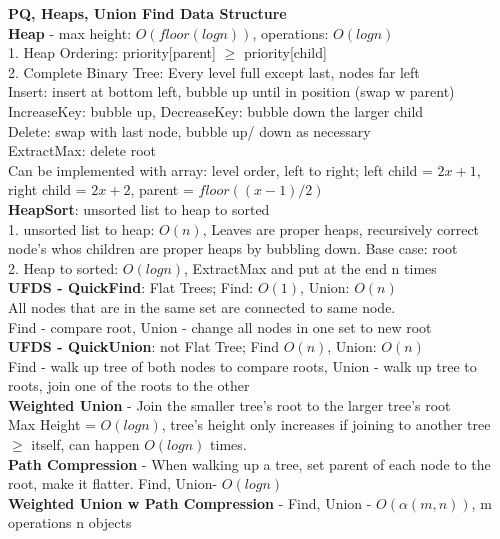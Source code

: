 \documentclass[10pt, a4paper]{article}
\begin{document}
\begin{multicols*}{3}
		{\normalsize\textbf{PQ, Heaps, Union Find Data Structure}}\\
		\textbf{Heap} - max height: $O(floor(logn))$, operations: $O(logn)$\\
		1. Heap Ordering: priority[parent] $\geq$ priority[child]\\
		2. Complete Binary Tree: Every level full except last, nodes far left \\
		Insert: insert at bottom left, bubble up until in position (swap w parent)\\
		IncreaseKey: bubble up, DecreaseKey: bubble down the larger child\\
		Delete: swap with last node, bubble up/ down as necessary\\
		ExtractMax: delete root\\
		Can be implemented with array: level order, left to right; left child = $2x + 1$, right child = $2x + 2$, parent = $floor((x-1)/2)$\\
		\textbf{HeapSort}: unsorted list to heap to sorted\\
		1. unsorted list to heap: $O(n)$, Leaves are proper heaps, recursively correct node's whos children are proper heaps by bubbling down. Base case: root\\
		2. Heap to sorted: $O(logn)$, ExtractMax and put at the end n times\\
		\textbf{UFDS - QuickFind}: Flat Trees; Find: $O(1)$, Union: $O(n)$\\
		All nodes that are in the same set are connected to same node.\\
		Find - compare root, Union - change all nodes in one set to new root\\
		\textbf{UFDS - QuickUnion}: not Flat Tree; Find $O(n)$, Union: $O(n)$\\
		Find - walk up tree of both nodes to compare roots, Union - walk up tree to roots, join one of the roots to the other\\
		\textbf{Weighted Union} - Join the smaller tree's root to the larger tree's root\\
		Max Height = $O(logn)$, tree's height only increases if joining to another tree $\geq$ itself, can happen $O(logn)$ times.\\
		\textbf{Path Compression} - When walking up a tree, set parent of each node to the root, make it flatter. Find, Union- $O(logn)$\\
		\textbf{Weighted Union w Path Compression} - Find, Union - $O(\alpha(m, n))$, m operations n objects\\

\end{multicols*}
\end{document}
